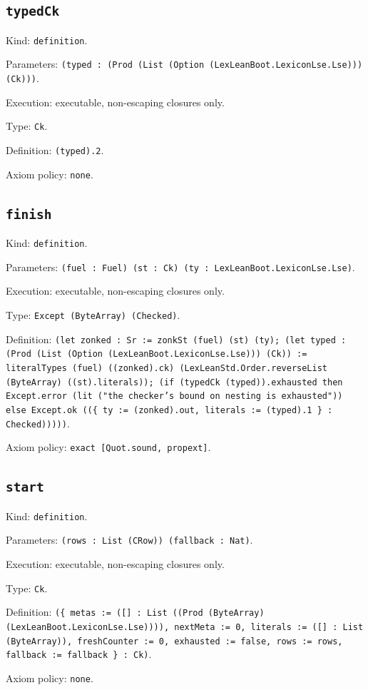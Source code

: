 \documentclass[11pt]{article}
\begin{document}
\subsection*{\texttt{typedCk}}
\noindent Kind: \texttt{definition}.\par
\noindent Parameters: \texttt{(typed : (Prod (List (Option (LexLeanBoot.LexiconLse.Lse))) (Ck)))}.\par
\noindent Execution: executable, non-escaping closures only.\par
\noindent Type: \texttt{Ck}.\par
\noindent Definition: \texttt{(typed).2}.\par
\noindent Axiom policy: \texttt{none}.\par
\subsection*{\texttt{finish}}
\noindent Kind: \texttt{definition}.\par
\noindent Parameters: \texttt{(fuel : Fuel) (st : Ck) (ty : LexLeanBoot.LexiconLse.Lse)}.\par
\noindent Execution: executable, non-escaping closures only.\par
\noindent Type: \texttt{Except (ByteArray) (Checked)}.\par
\noindent Definition: \texttt{(let zonked : Sr := zonkSt (fuel) (st) (ty); (let typed : (Prod (List (Option (LexLeanBoot.LexiconLse.Lse))) (Ck)) := literalTypes (fuel) ((zonked).ck) (LexLeanStd.Order.reverseList (ByteArray) ((st).literals)); (if (typedCk (typed)).exhausted then Except.error (lit ("the checker's bound on nesting is exhausted")) else Except.ok ((\{ ty := (zonked).out, literals := (typed).1 \} : Checked)))))}.\par
\noindent Axiom policy: \texttt{exact [Quot.sound, propext]}.\par
\subsection*{\texttt{start}}
\noindent Kind: \texttt{definition}.\par
\noindent Parameters: \texttt{(rows : List (CRow)) (fallback : Nat)}.\par
\noindent Execution: executable, non-escaping closures only.\par
\noindent Type: \texttt{Ck}.\par
\noindent Definition: \texttt{(\{ metas := ([] : List ((Prod (ByteArray) (LexLeanBoot.LexiconLse.Lse)))), nextMeta := 0, literals := ([] : List (ByteArray)), freshCounter := 0, exhausted := false, rows := rows, fallback := fallback \} : Ck)}.\par
\noindent Axiom policy: \texttt{none}.\par
\end{document}
